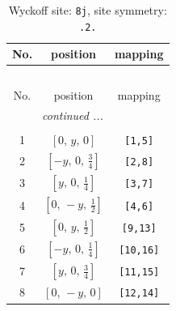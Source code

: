 \documentclass[fleqn,8pt]{jsarticle}
\begin{document}
\begin{longtable}{ccc}
\caption{Wyckoff site: {\tt 8j}, site symmetry: {\tt .2.}}
 \\
 \hline \hline
No. & position & mapping \\ \hline \endfirsthead

\multicolumn{2}{l}{\tablename\ \thetable{}} \\
 \hline \hline
No. & position & mapping \\ \hline \endhead

 \hline \hline
\multicolumn{2}{r}{\footnotesize\it continued ...} \\ \endfoot

 \hline \hline
\multicolumn{2}{r}{} \\ \endlastfoot

1 & $\left[ 0,\, y,\, 0 \right]$ & {\tt [1,5]} \\ \hline
2 & $\left[ - y,\, 0,\, \frac{3}{4} \right]$ & {\tt [2,8]} \\ \hline
3 & $\left[ y,\, 0,\, \frac{1}{4} \right]$ & {\tt [3,7]} \\ \hline
4 & $\left[ 0,\, - y,\, \frac{1}{2} \right]$ & {\tt [4,6]} \\ \hline
5 & $\left[ 0,\, y,\, \frac{1}{2} \right]$ & {\tt [9,13]} \\ \hline
6 & $\left[ - y,\, 0,\, \frac{1}{4} \right]$ & {\tt [10,16]} \\ \hline
7 & $\left[ y,\, 0,\, \frac{3}{4} \right]$ & {\tt [11,15]} \\ \hline
8 & $\left[ 0,\, - y,\, 0 \right]$ & {\tt [12,14]} \\
\end{longtable}
\renewcommand{\arraystretch}{1.2}
\end{document}
